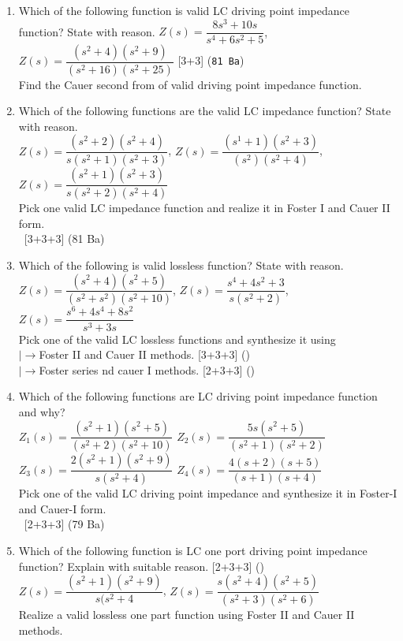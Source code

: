 \documentclass[12pt]{article}
\newcommand{\lb}{\\$\left|\rightarrow\right.$}
\newcommand{\enter}{\\\textcolor{white}{1}}
\begin{document}
\begin{enumerate}
	
	\item Which of the following function is valid LC driving point impedance function? State with reason.
$Z(s) = \dfrac{8s^3+10s}{s^4+6s^2+5}$,\hspace*{1cm}    $Z(s) = \dfrac{(s^2+4)(s^2+9)}{(s^2+16)(s^2+25)}$ \hfill [3+3] (\texttt{81 Ba})\\
Find the Cauer second from of valid driving point impedance function.
	
	\item Which of the following functions are the valid LC impedance function? State with reason.\\
	$Z(s) = \dfrac{(s^2+2)(s^2+4)}{s(s^2+1)(s^2+3)}$, \hspace{1cm} $Z(s) = \dfrac{(s^1+1)(s^2+3)}{(s^2)(s^2+4)}$, \hspace{1cm} $Z(s) = \dfrac{(s^2+1)(s^2+3)}{s(s^2+2)(s^2+4)}$\\
	Pick one valid LC impedance function and realize it in Foster I and Cauer II form. 
	\enter\hfill [3+3+3] (81 Ba)
	
	\item Which of the following is valid lossless function? State with reason. \\
	$Z(s) = \dfrac{(s^2+4)(s^2+5)}{(s^2+s^2)(s^2+10)}$, \hspace{1cm} $Z(s)= \dfrac{s^4+4s^2+3}{s(s^2+2)}$, \hspace{1cm} $Z(s) = \dfrac{s^6+4s^4+8s^2}{s^3+3s}$\\
	Pick one of the valid LC lossless functions and synthesize it using
	\lb Foster II and Cauer II methods. \hfill [3+3+3] ()
	\lb Foster series nd cauer I methods. \hfill [2+3+3] ()
	
	\item Which of the following functions are LC driving point impedance function and why?\\
	$Z_1 (s)=\dfrac{(s^2+1)(s^2+5)}{(s^2+2)(s^2+10)}$ \hspace{2cm}
	$Z_2 (s)=\dfrac{5s(s^2+5)}{(s^2+1)(s^2+2)}$\\[2pt]
	$Z_3 (s)=\dfrac{2(s^2+1)(s^2+9)}{s(s^2+4)}$ \hspace{2cm}
	$Z_4 (s)=\dfrac{4(s+2)(s+5)}{(s+1)(s+4)}$\\
	Pick one of the valid LC driving point impedance and synthesize it in Foster-I and Cauer-I form.
	\enter\hfill [2+3+3] (79 Ba)
	
	\item Which of the following function is LC one port driving point impedance function? Explain with suitable reason. \hfill [2+3+3] ()\\
	$Z(s) = \dfrac{(s^2+1)(s^2+9)}{s(s^2+4}$, \hspace{2cm}
	$Z(s) = \dfrac{s(s^2+4)(s^2+5)}{(s^2+3)(s^2+6)}$\\
	Realize a valid lossless one part function using Foster II and Cauer II methods.
	

\end{enumerate}
\end{document}

